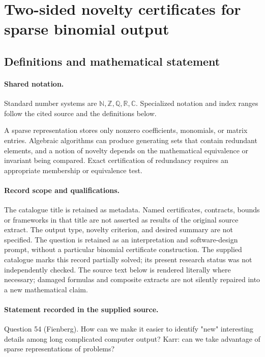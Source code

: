 \documentclass[11pt]{article}
\begin{document}
\section{Two-sided novelty certificates for sparse binomial output}\label{statement}

\subsection{Definitions and mathematical statement}

\paragraph{Shared notation.}Standard number systems are $\mathbb N,\mathbb Z,\mathbb Q,\mathbb R,\mathbb C$. Specialized notation and index ranges follow the cited source and the definitions below.


A sparse representation stores only nonzero coefficients, monomials, or matrix entries. Algebraic algorithms can produce generating sets that contain redundant elements, and a notion of novelty depends on the mathematical equivalence or invariant being compared. Exact certification of redundancy requires an appropriate membership or equivalence test.
\paragraph{Record scope and qualifications.}
The catalogue title is retained as metadata. Named certificates, contracts, bounds or frameworks in that title are not asserted as results of the original source extract.
The output type, novelty criterion, and desired summary are not specified. The question is retained as an interpretation and software-design prompt, without a particular binomial certificate construction. The supplied catalogue marks this record partially solved; its present research status was not independently checked.
The source text below is rendered literally where necessary; damaged formulas and composite extracts are not silently repaired into a new mathematical claim.
\paragraph{Statement recorded in the supplied source.}
Question 54 (Fienberg). How can we make it easier to identify "new" interesting details among long complicated computer output? Karr: can we take advantage of sparse representations of problems?
\end{document}

